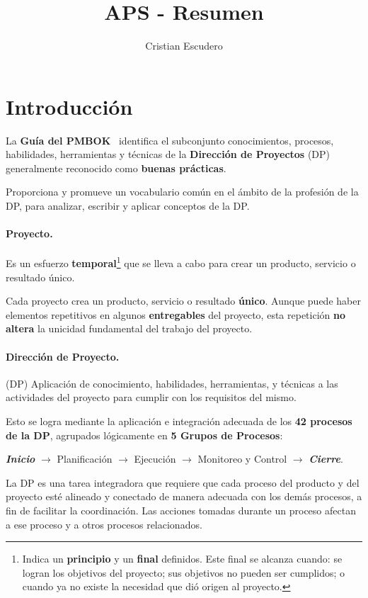 \documentclass[10pt,a4paper]{article}
\author{Cristian Escudero}
\title{APS - Resumen}
\begin{document}
\maketitle

\section{Introducción}

La \textbf{Guía del PMBOK\textregistered} \, identifica el subconjunto conocimientos, procesos, habilidades, herramientas y técnicas de la \textbf{Dirección de Proyectos} (DP) generalmente reconocido como \textbf{buenas prácticas}.

Proporciona y promueve un vocabulario común en el ámbito de la profesión de la DP, para analizar, escribir y aplicar conceptos de la DP.

\paragraph{Proyecto.} Es un esfuerzo \textbf{temporal}\footnote{Indica un \textbf{principio} y un \textbf{final} definidos. Este final se alcanza cuando: se logran los objetivos del proyecto; sus objetivos no pueden ser cumplidos; o cuando ya no existe la necesidad que dió origen al proyecto.} que se lleva a cabo para crear un producto, servicio o resultado único.

Cada proyecto crea un producto, servicio o resultado \textbf{único}. Aunque puede haber elementos repetitivos en algunos \textbf{entregables} del proyecto, esta repetición \textbf{no altera} la unicidad fundamental del trabajo del proyecto.

\paragraph{Dirección de Proyecto.} (DP) Aplicación de conocimiento, habilidades, herramientas, y técnicas a las actividades del proyecto para cumplir con los requisitos del mismo.

Esto se logra mediante la aplicación e integración adecuada de los \textbf{42 procesos de la DP}, agrupados lógicamente en \textbf{5 Grupos de Procesos}: 

\textbf{\textit{Inicio}} $\rightarrow$ Planificación $\rightarrow$ Ejecución $\rightarrow$ Monitoreo y Control $\rightarrow$ \textbf{\textit{Cierre}}.

La DP es una tarea integradora que requiere que cada proceso del producto y del proyecto esté alineado y conectado de manera adecuada con los demás procesos, a fin de facilitar la coordinación. Las acciones tomadas durante un proceso afectan a ese proceso y a otros procesos relacionados.
\end{document}
